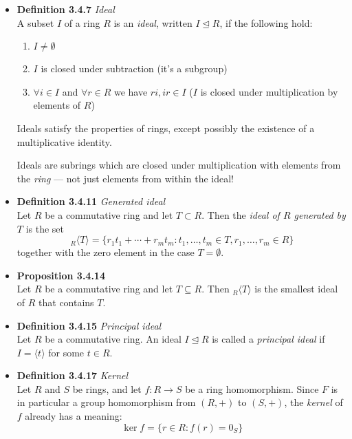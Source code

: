 \documentclass[11pt,a4paper]{article}
\begin{document}
\begin{itemize}
    \item \textbf{Definition 3.4.7} \emph{Ideal} \\
        A subset $I$ of a ring $R$ is an \emph{ideal}, written $I \trianglelefteq R$,
        if the following hold:
        \begin{enumerate}
            \item $I \neq \emptyset$
            \item $I$ is closed under subtraction (it's a subgroup)
            \item $\forall i \in I$ and $\forall r \in R$ we have $ri, ir \in I$
                ($I$ is closed under multiplication by elements of $R$)
        \end{enumerate}
        Ideals satisfy the properties of rings, except possibly the existence of a
        multiplicative identity.

        Ideals are subrings which are closed under multiplication with elements from the
        \emph{ring} --- not just elements from within the ideal!

    \item \textbf{Definition 3.4.11} \emph{Generated ideal} \\
        Let $R$ be a commutative ring and let $T \subset R$.
        Then the \emph{ideal of $R$ generated by $T$} is the set
        \[
            _R\langle T \rangle = \{ {r_1}{t_1} + \cdots + {r_m}{t_m} : t_1, \ldots,
                t_m \in T, r_1, \ldots, r_m \in R \}
        \]
        together with the zero element in the case $T = \emptyset$.

    \item \textbf{Proposition 3.4.14} \\
        Let $R$ be a commutative ring and let $T \subseteq R$.
        Then $_R \langle T \rangle$ is the smallest ideal of $R$ that contains $T$.

    \item \textbf{Definition 3.4.15} \emph{Principal ideal} \\
        Let $R$ be a commutative ring.
        An ideal $I \trianglelefteq R$ is called a \emph{principal ideal} if
        $I = \langle t \rangle$ for some $t \in R$.

    \item \textbf{Definition 3.4.17} \emph{Kernel} \\
        Let $R$ and $S$ be rings, and let $f : R \to S$ be a ring homomorphism.
        Since $F$ is in particular a group homomorphism from $(R,+)$ to $(S,+)$,
        the \emph{kernel} of $f$ already has a meaning:
        \[
            \ker f = \{ r \in R : f(r) = 0_S \}
        \]


\end{itemize}
\end{document}
